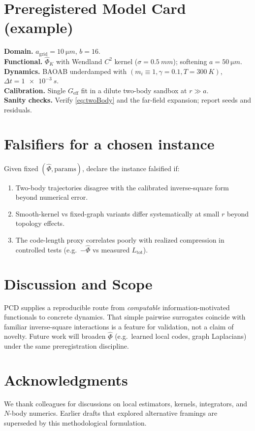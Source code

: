\documentclass[11pt,a4paper]{article}
\numberwithin{equation}{section}
\begin{document}
\section{Preregistered Model Card (example)}
\textbf{Domain.} $a_{\text{grid}}=\SI{10}{\micro m}$, $b=16$. \\
\textbf{Functional.} $\widehat{\Phi}_K$ with Wendland $C^2$ kernel ($\sigma=\SI{0.5}{mm}$); softening $a=\SI{50}{\micro m}$. \\
\textbf{Dynamics.} BAOAB underdamped with $(m_i\equiv 1,\gamma=0.1,T=\SI{300}{K})$, $\Delta t=\SI{1e-3}{s}$. \\
\textbf{Calibration.} Single $G_{\text{eff}}$ fit in a dilute two-body sandbox at $r\gg a$. \\
\textbf{Sanity checks.} Verify \eqref{eq:twoBody} and the far-field expansion; report seeds and residuals.

\section{Falsifiers for a chosen instance}
Given fixed $(\widehat{\Phi},\text{params})$, declare the instance falsified if:
\begin{enumerate}[label=(F\arabic*)]
\item Two-body trajectories disagree with the calibrated inverse-square form beyond numerical error.
\item Smooth-kernel vs fixed-graph variants differ systematically at small $r$ beyond topology effects.
\item The code-length proxy correlates poorly with realized compression in controlled tests (e.g.\ $-\widehat{\Phi}$ vs measured $L_{\text{tot}}$).
\end{enumerate}

\section{Discussion and Scope}
PCD supplies a reproducible route from \emph{computable} information-motivated functionals to concrete dynamics. That simple pairwise surrogates coincide with familiar inverse-square interactions is a feature for validation, not a claim of novelty. Future work will broaden $\widehat{\Phi}$ (e.g.\ learned local codes, graph Laplacians) under the same preregistration discipline.

\section*{Acknowledgments}
We thank colleagues for discussions on local estimators, kernels, integrators, and $N$-body numerics. Earlier drafts that explored alternative framings are superseded by this methodological formulation.
\end{document}

